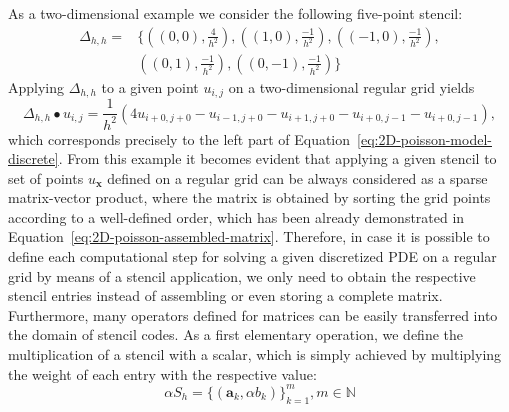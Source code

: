 As a two-dimensional example we consider the following five-point stencil:
\begin{equation}
	\begin{split}
		\Delta_{h,h} = & \bigg\{ \left( \left( 0,0 \right), \frac{4}{h^2}\right), \left(\left(1,0\right), \frac{-1}{h^2}\right), \left(\left(-1,0\right), \frac{-1}{h^2}\right), \\ & \left(\left(0,1\right), \frac{-1}{h^2}\right), \left(\left(0,-1\right), \frac{-1}{h^2}\right) \bigg\}
	\end{split}
	\label{eq:five-point-stencil}
\end{equation}
Applying $\Delta_{h,h}$ to a given point $u_{i,j}$ on a two-dimensional regular grid yields 
\begin{equation}
	\Delta_{h,h} \bullet u_{i,j} = \frac{1}{h^2} \left(4 u_{i+0,j+0}  - u_{i-1,j+0} - u_{i+1,j+0} - u_{i+0,j-1} - u_{i+0,j-1}\right),
\end{equation}
which corresponds precisely to the left part of Equation~\eqref{eq:2D-poisson-model-discrete}.
From this example it becomes evident that applying a given stencil to set of points $u_{\bm x}$ defined on a regular grid can be always considered as a sparse matrix-vector product, where the matrix is obtained by sorting the grid points according to a well-defined order, which has been already demonstrated in Equation~\eqref{eq:2D-poisson-assembled-matrix}.
Therefore, in case it is possible to define each computational step for solving a given discretized PDE on a regular grid by means of a stencil application, we only need to obtain the respective stencil entries instead of assembling or even storing a complete matrix.
Furthermore, many operators defined for matrices can be easily transferred into the domain of stencil codes.
As a first elementary operation, we define the multiplication of a stencil with a scalar, which is simply achieved by multiplying the weight of each entry with the respective value:
\begin{equation}
	\alpha S_h = \{(\bm{a}_k, \alpha b_k) \}_{k=1}^m, m \in \mathbb{N}
\end{equation}

